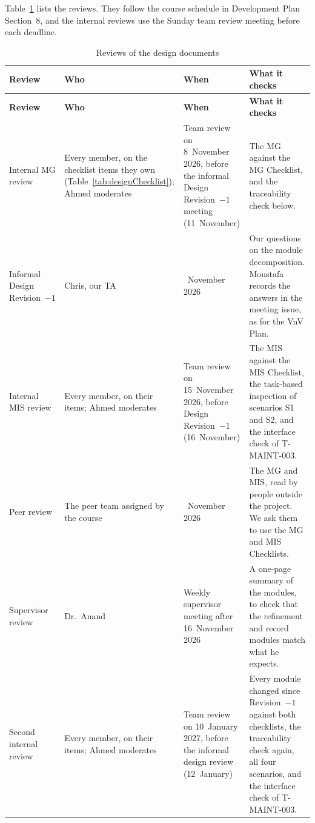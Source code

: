 \documentclass[12pt, titlepage]{article}
\begin{document}
Table~\ref{tab:designReviews} lists the reviews. They follow the course
schedule in Development Plan Section~8, and the internal reviews use the
Sunday team review meeting before each deadline.

{\small
\begin{longtable}{@{}>{\raggedright\arraybackslash}p{}
  >{\raggedright\arraybackslash}p{}
  >{\raggedright\arraybackslash}p{}
  >{\raggedright\arraybackslash}p{}@{}}
\caption{Reviews of the design documents}
\label{tab:designReviews}\\
\toprule
\textbf{Review} & \textbf{Who} & \textbf{When} & \textbf{What it checks} \\
\midrule
\endfirsthead
\toprule
\textbf{Review} & \textbf{Who} & \textbf{When} & \textbf{What it checks} \\
\midrule
\endhead
\bottomrule
\endlastfoot
Internal MG review & Every member, on the checklist items they own
(Table~\ref{tab:designChecklist}); Ahmed moderates & Team review on
8~November 2026, before the informal Design Revision~$-1$ meeting
(11~November) & The MG against the MG Checklist, and the traceability check
below. \\
\addlinespace
Informal Design Revision~$-1$ & Chris, our TA & 11~November 2026 & Our
questions on the module decomposition. Moustafa records the answers in the
meeting issue, as for the VnV Plan. \\
\addlinespace
Internal MIS review & Every member, on their items; Ahmed moderates &
Team review on 15~November 2026, before Design Revision~$-1$
(16~November) & The MIS against the MIS Checklist, the task-based inspection
of scenarios S1 and S2, and the interface check of T-MAINT-003. \\
\addlinespace
Peer review & The peer team assigned by the course & 19~November 2026 &
The MG and MIS, read by people outside the project. We ask them to use the
MG and MIS Checklists. \\
\addlinespace
Supervisor review & Dr.\ Anand & Weekly supervisor meeting after
16~November 2026 & A one-page summary of the modules, to check that the
refinement and record modules match what he expects. \\
\addlinespace
Second internal review & Every member, on their items; Ahmed moderates &
Team review on 10~January 2027, before the informal design review
(12~January) & Every module changed since Revision~$-1$ against both
checklists, the traceability check again, all four scenarios, and the
interface check of T-MAINT-003. \\

\end{longtable}}
\end{document}
